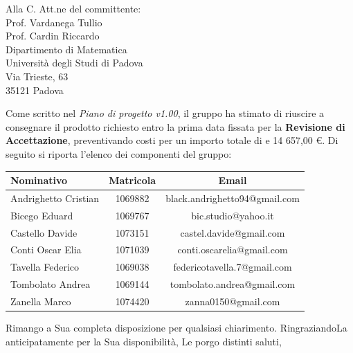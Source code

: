 \documentclass[a4paper,12pt]{letteracdp}
\begin{document}
\begin{letter}{
		Alla C. Att.ne del committente: \\
		Prof. Vardanega Tullio \\
		Prof. Cardin Riccardo \\
		Dipartimento di Matematica \\
		Università degli Studi di Padova \\
		Via Trieste, 63 \\
		35121 Padova}
\begin{itemize}
\end{itemize}

Come scritto nel \textit{Piano di progetto v1.00}, il gruppo ha stimato di riuscire a consegnare il prodotto richiesto entro la prima data fissata per la \textbf{Revisione di Accettazione}, preventivando costi per un importo totale di e 14 657,00 \euro. Di seguito si riporta l'elenco dei componenti del gruppo:

\begin{center}
		\begin{tabular}{l c c}
			\toprule
			\textbf{Nominativo} & \textbf{Matricola} & \textbf{Email} \\
			\midrule
			Andrighetto Cristian & 1069882 & black.andrighetto94@gmail.com \\
			Bicego Eduard & 1069767 & bic.studio@yahoo.it  \\
			Castello Davide	& 1073151 &	 castel.davide@gmail.com\\
			Conti Oscar Elia & 1071039 & conti.oscarelia@gmail.com \\
			Tavella Federico & 1069038 & federicotavella.7@gmail.com\\
			Tombolato Andrea & 1069144 & tombolato.andrea@gmail.com	 \\
			Zanella Marco & 1074420 & zanna0150@gmail.com \\
			\bottomrule
		\end{tabular}
\end{center}
		
		\closing{Rimango a Sua completa disposizione per qualsiasi chiarimento. RingraziandoLa anticipatamente per la Sua disponibilità, Le porgo distinti saluti,}
		
	\end{letter}
\end{document}
